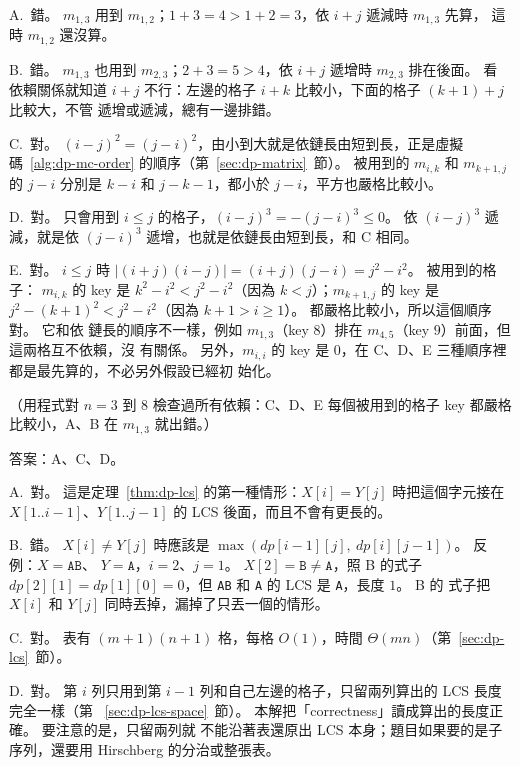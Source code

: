 A.\ 錯。 $m_{1,3}$ 用到 $m_{1,2}$；$1 + 3 = 4 > 1 + 2 = 3$，依 $i + j$ 遞減時 $m_{1,3}$ 先算，
這時 $m_{1,2}$ 還沒算。

B.\ 錯。 $m_{1,3}$ 也用到 $m_{2,3}$；$2 + 3 = 5 > 4$，依 $i + j$ 遞增時 $m_{2,3}$ 排在後面。 看
依賴關係就知道 $i + j$ 不行：左邊的格子 $i + k$ 比較小，下面的格子 $(k + 1) + j$ 比較大，不管
遞增或遞減，總有一邊排錯。

C.\ 對。 $(i - j)^2 = (j - i)^2$，由小到大就是依鏈長由短到長，正是虛擬碼~\ref{alg:dp-mc-order}
的順序（第~\ref{sec:dp-matrix}~節）。 被用到的 $m_{i,k}$ 和 $m_{k+1,j}$ 的 $j - i$ 分別是
$k - i$ 和 $j - k - 1$，都小於 $j - i$，平方也嚴格比較小。

D.\ 對。 只會用到 $i \le j$ 的格子，$(i - j)^3 = -(j - i)^3 \le 0$。 依 $(i - j)^3$ 遞減，就是依
$(j - i)^3$ 遞增，也就是依鏈長由短到長，和 C 相同。

E.\ 對。 $i \le j$ 時 $|(i + j)(i - j)| = (i + j)(j - i) = j^2 - i^2$。 被用到的格子：
$m_{i,k}$ 的 key 是 $k^2 - i^2 < j^2 - i^2$（因為 $k < j$）；$m_{k+1,j}$ 的 key 是
$j^2 - (k + 1)^2 < j^2 - i^2$（因為 $k + 1 > i \ge 1$）。 都嚴格比較小，所以這個順序對。 它和依
鏈長的順序不一樣，例如 $m_{1,3}$（key $8$）排在 $m_{4,5}$（key $9$）前面，但這兩格互不依賴，沒
有關係。 另外，$m_{i,i}$ 的 key 是 $0$，在 C、D、E 三種順序裡都是最先算的，不必另外假設已經初
始化。

（用程式對 $n = 3$ 到 $8$ 檢查過所有依賴：C、D、E 每個被用到的格子 key 都嚴格比較小，A、B 在
$m_{1,3}$ 就出錯。）

答案：A、C、D。

A.\ 對。 這是定理~\ref{thm:dp-lcs} 的第一種情形：$X[i] = Y[j]$ 時把這個字元接在
$X[1..i-1]$、$Y[1..j-1]$ 的 LCS 後面，而且不會有更長的。

B.\ 錯。 $X[i] \ne Y[j]$ 時應該是 $\max(dp[i-1][j],\ dp[i][j-1])$。 反例：$X = \texttt{AB}$、
$Y = \texttt{A}$，$i = 2$、$j = 1$。 $X[2] = \texttt{B} \ne \texttt{A}$，照 B 的式子
$dp[2][1] = dp[1][0] = 0$，但 \texttt{AB} 和 \texttt{A} 的 LCS 是 \texttt{A}，長度 $1$。 B 的
式子把 $X[i]$ 和 $Y[j]$ 同時丟掉，漏掉了只丟一個的情形。

C.\ 對。 表有 $(m + 1)(n + 1)$ 格，每格 $O(1)$，時間 $\Theta(mn)$（第~\ref{sec:dp-lcs}~節）。

D.\ 對。 第 $i$ 列只用到第 $i - 1$ 列和自己左邊的格子，只留兩列算出的 LCS 長度完全一樣（第~
\ref{sec:dp-lcs-space}~節）。 本解把「correctness」讀成算出的長度正確。 要注意的是，只留兩列就
不能沿著表還原出 LCS 本身；題目如果要的是子序列，還要用 Hirschberg 的分治或整張表。

